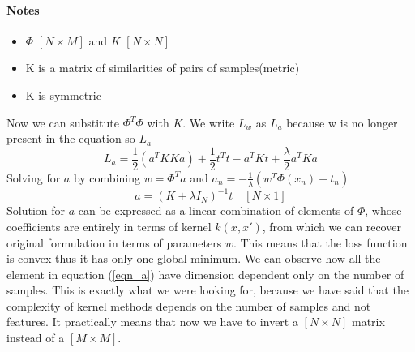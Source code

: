 \documentclass[../main.tex]{subfiles}
\begin{document}
\paragraph{Notes}
\begin{itemize}
    \item $\Phi$ $[N \times M]$ and $K$ $[N \times N]$
    \item K is a matrix of similarities of pairs of samples(metric)
    \item K is symmetric
\end{itemize}
Now we can substitute $\Phi^T \Phi$ with $K$. We write $L_w$ as $L_a$ because w is no longer present in the equation so $L_a$
\begin{equation*}
    L_a = \frac{1}{2}(a^T K K a) + \frac{1}{2}t^T t - a^T K t +\frac{\lambda}{2} a^T K a
\end{equation*}
Solving for $a$ by combining $w=\Phi^T a$ and $a_n=-\frac{1}{\lambda}(w^T \Phi(x_n)-t_n)$
\begin{equation}
    a = (K + \lambda I_N)^{-1} t \quad [N \times 1]
\end{equation} \label{eqn_a}
Solution for $a$ can be expressed as a linear combination of elements of $\Phi$, whose coefficients are entirely in terms of kernel $k(x,x')$, from
which we can recover original formulation in terms of parameters $w$. This means that the loss function is convex thus it has only one global minimum. We can observe how all the element in equation (\ref{eqn_a}) have dimension dependent only on the number of samples. This is exactly what we were looking for, because we have said that the complexity of kernel methods depends on the number of samples and not features. It practically means that now we have to invert a $[N \times N]$
matrix instead of a $[M \times M]$.
\end{document}
